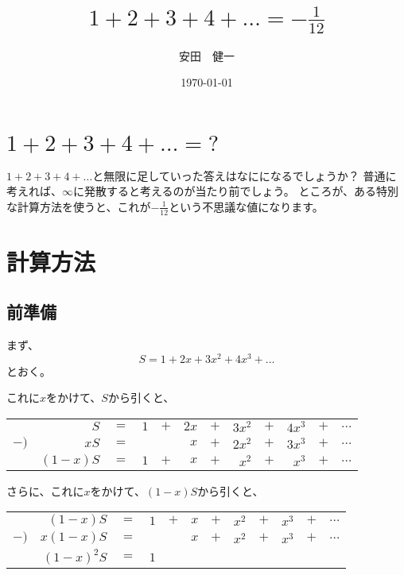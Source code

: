 \documentclass[a4paper,12pt,fleqn]{ltjsarticle}
\begin{document}
\title{$1+2+3+4+\dots=-\frac{1}{12}$}
\author{安田　健一}
\date{\today}

\maketitle

\newpage

\section{$1+2+3+4+\dots=?$}
$1+2+3+4+\dots$と無限に足していった答えはなにになるでしょうか？
普通に考えれば、$\infty$に発散すると考えるのが当たり前でしょう。
ところが、ある特別な計算方法を使うと、これが$-\frac{1}{12}$という不思議な値になります。

\section{計算方法}

\subsection{前準備}
まず、
\begin{equation}
    \label{S-open}
    S = 1 + 2x + 3x^2 + 4x^3 + \dots
\end{equation}
とおく。

これに$x$をかけて、$S$から引くと、

\begin{tabular}{rrrrrrrrrrrr}
           &$S$  & $=$ & $1$ & $+$ & $2x$ & $+$ & $3x^2$ & $+$ & $4x^3$ & $+$ & $\dots$ \\
       $-)$&$xS$ & $=$ &     &     & $x$  & $+$ & $2x^2$ & $+$ & $3x^3$ & $+$ &$\dots$ \\ \hline
       &$(1-x)S$ & $=$ & $1$ & $+$ & $x$  & $+$ & $x^2$  & $+$ & $x^3$  & $+$ &$\dots$
\end{tabular}

さらに、これに$x$をかけて、$(1-x)S$から引くと、

\begin{tabular}{rrrrrrrrrrrr}
     &$(1-x)S$ & $=$ & $1$ & $+$ & $x$ & $+$ & $x^2$ & $+$ & $x^3$ & $+$ & $\dots$ \\
$-)$&$x(1-x)S$ & $=$ &     &     & $x$ & $+$ & $x^2$ & $+$ & $x^3$ & $+$ &$\dots$ \\ \hline
   &$(1-x)^2S$ & $=$ & $1$ &     &     &     &       &     &       &     &
\end{tabular}
\end{document}
